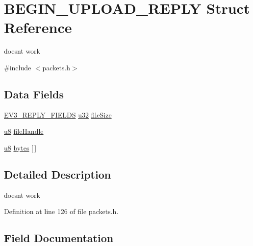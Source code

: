 \hypertarget{struct_b_e_g_i_n___u_p_l_o_a_d___r_e_p_l_y}{}\section{B\+E\+G\+I\+N\+\_\+\+U\+P\+L\+O\+A\+D\+\_\+\+R\+E\+P\+L\+Y Struct Reference}
\label{struct_b_e_g_i_n___u_p_l_o_a_d___r_e_p_l_y}


doesn\textquotesingle{}t work  




{\ttfamily \#include $<$packets.\+h$>$}

\subsection*{Data Fields}
\begin{DoxyCompactItemize}
\item 
\hyperlink{packets_8h_a382c165d520d462ac8f0c88e2a1970cb}{E\+V3\+\_\+\+R\+E\+P\+L\+Y\+\_\+\+F\+I\+E\+L\+D\+S} \hyperlink{defs_8h_afaa62991928fb9fb18ff0db62a040aba}{u32} \hyperlink{struct_b_e_g_i_n___u_p_l_o_a_d___r_e_p_l_y_afa8cac994ec0579d07285b61ffc8e0c7}{file\+Size}
\item 
\hyperlink{defs_8h_a92c50087ca0e64fa93fc59402c55f8ca}{u8} \hyperlink{struct_b_e_g_i_n___u_p_l_o_a_d___r_e_p_l_y_a1db5fbf603ad47a12353736f89c95073}{file\+Handle}
\item 
\hyperlink{defs_8h_a92c50087ca0e64fa93fc59402c55f8ca}{u8} \hyperlink{struct_b_e_g_i_n___u_p_l_o_a_d___r_e_p_l_y_a1fdde1580342b6b1df0d8f5213c45107}{bytes} \mbox{[}$\,$\mbox{]}
\end{DoxyCompactItemize}


\subsection{Detailed Description}
doesn\textquotesingle{}t work 

Definition at line 126 of file packets.\+h.



\subsection{Field Documentation}
\hypertarget{struct_b_e_g_i_n___u_p_l_o_a_d___r_e_p_l_y_a1fdde1580342b6b1df0d8f5213c45107}{}
